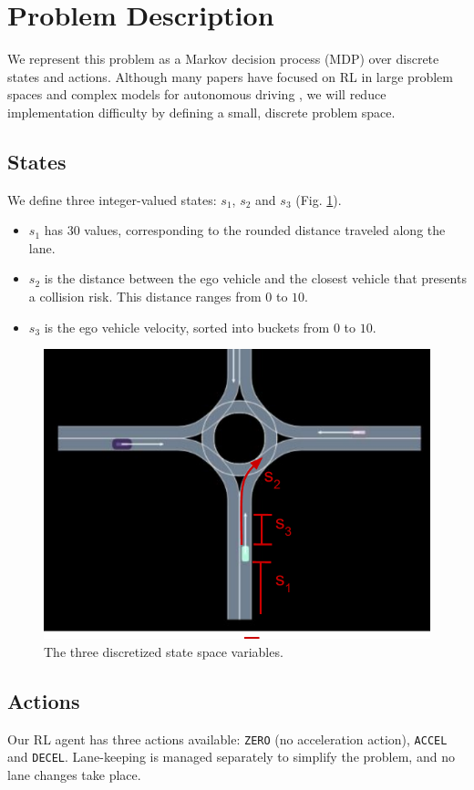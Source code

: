 \documentclass[conference]{IEEEtran}
\begin{document}
\section*{Problem Description}
We represent this problem as a Markov decision process (MDP) over discrete states and actions. Although many papers have focused on RL in large problem spaces and complex models for autonomous driving \cite{kiran2021deep, zhu2020safe}, we will reduce implementation difficulty by defining a small, discrete problem space.

\subsection*{States} We define three integer-valued states: $s_1$, $s_2$ and $s_3$ (Fig. \ref{fig:statespace}).
\begin{itemize}
	\item
$s_1$ has 30 values, corresponding to the rounded distance traveled along the lane.
 \item
$s_2$ is the distance between the ego vehicle and the closest vehicle that presents a collision risk. This distance ranges from $0$ to $10$.
\item
$s_3$ is the ego vehicle velocity, sorted into buckets from $0$ to $10$.
\end{itemize}

\begin{figure}[h!]
	\centering
	\includegraphics[width=0.8\linewidth]{figures/statespace.pdf}
	\caption{The three discretized state space variables.}
	\label{fig:statespace}
\end{figure}

\subsection*{Actions} Our RL agent has three actions available: \verb|ZERO| (no acceleration action), \verb|ACCEL| and \verb|DECEL|. Lane-keeping is managed separately to simplify the problem, and no lane changes take place.
\end{document}
